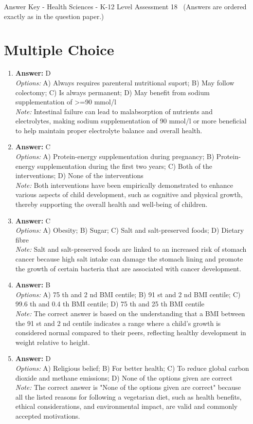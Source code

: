 \documentclass[12pt]{article}
\begin{document}
\begin{center}
Answer Key - Health Sciences - K-12 Level Assessment 18 \
\small (Answers are ordered exactly as in the question paper.)
\end{center}

\section*{Multiple Choice}
\begin{enumerate}[label=\arabic*.]
\item \textbf{Answer:} D
\\ \textit{Options:} A) Always requires parenteral nutritional suport; B) May follow colectomy; C) Is always permanent; D) May benefit from sodium supplementation of \textgreater{}=90 mmol/l
\\ \textit{Note:} Intestinal failure can lead to malabsorption of nutrients and electrolytes, making sodium supplementation of 90 mmol/l or more beneficial to help maintain proper electrolyte balance and overall health.
\item \textbf{Answer:} C
\\ \textit{Options:} A) Protein-energy supplementation during pregnancy; B) Protein-energy supplementation during the first two years; C) Both of the interventions; D) None of the interventions
\\ \textit{Note:} Both interventions have been empirically demonstrated to enhance various aspects of child development, such as cognitive and physical growth, thereby supporting the overall health and well-being of children.
\item \textbf{Answer:} C
\\ \textit{Options:} A) Obesity; B) Sugar; C) Salt and salt-preserved foods; D) Dietary fibre
\\ \textit{Note:} Salt and salt-preserved foods are linked to an increased risk of stomach cancer because high salt intake can damage the stomach lining and promote the growth of certain bacteria that are associated with cancer development.
\item \textbf{Answer:} B
\\ \textit{Options:} A) 75 th and 2 nd BMI centile; B) 91 st and 2 nd BMI centile; C) 99.6 th and 0.4 th BMI centile; D) 75 th and 25 th BMI centile
\\ \textit{Note:} The correct answer is based on the understanding that a BMI between the 91 st and 2 nd centile indicates a range where a child's growth is considered normal compared to their peers, reflecting healthy development in weight relative to height.
\item \textbf{Answer:} D
\\ \textit{Options:} A) Religious belief; B) For better health; C) To reduce global carbon dioxide and methane emissions; D) None of the options given are correct
\\ \textit{Note:} The correct answer is "None of the options given are correct" because all the listed reasons for following a vegetarian diet, such as health benefits, ethical considerations, and environmental impact, are valid and commonly accepted motivations.
\end{enumerate}
\end{document}
